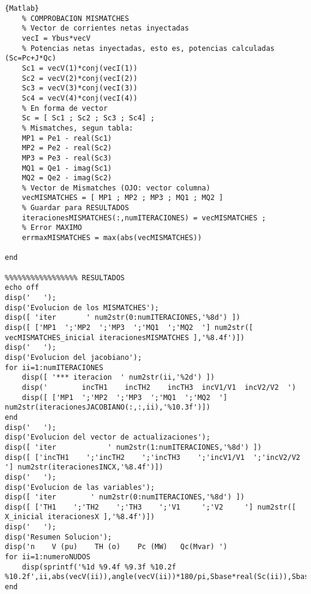 \documentclass[a4paper,10pt,titlepage,oneside]{article}
\begin{document}
{\begin{lstlisting}[frame=lines]{Matlab}
	% COMPROBACION MISMATCHES
	% Vector de corrientes netas inyectadas
	vecI = Ybus*vecV
	% Potencias netas inyectadas, esto es, potencias calculadas (Sc=Pc+J*Qc)
	Sc1 = vecV(1)*conj(vecI(1))
	Sc2 = vecV(2)*conj(vecI(2))
	Sc3 = vecV(3)*conj(vecI(3))
    Sc4 = vecV(4)*conj(vecI(4))
	% En forma de vector
	Sc = [ Sc1 ; Sc2 ; Sc3 ; Sc4] ;
	% Mismatches, segun tabla:
    MP1 = Pe1 - real(Sc1)
	MP2 = Pe2 - real(Sc2)
	MP3 = Pe3 - real(Sc3)
	MQ1 = Qe1 - imag(Sc1)
    MQ2 = Qe2 - imag(Sc2)
	% Vector de Mismatches (OJO: vector columna)
	vecMISMATCHES = [ MP1 ; MP2 ; MP3 ; MQ1 ; MQ2 ]
	% Guardar para RESULTADOS
	iteracionesMISMATCHES(:,numITERACIONES) = vecMISMATCHES ;
	% Error MAXIMO
	errmaxMISMATCHES = max(abs(vecMISMATCHES)) 

end

%%%%%%%%%%%%%%%%% RESULTADOS
echo off
disp('   ');
disp('Evolucion de los MISMATCHES');
disp([ 'iter       ' num2str(0:numITERACIONES,'%8d') ])
disp([ ['MP1  ';'MP2  ';'MP3  ';'MQ1  ';'MQ2  '] num2str([ vecMISMATCHES_inicial iteracionesMISMATCHES ],'%8.4f')])
disp('   ');
disp('Evolucion del jacobiano');
for ii=1:numITERACIONES
	disp([ '*** iteracion  ' num2str(ii,'%2d') ])
	disp('        incTH1    incTH2    incTH3  incV1/V1  incV2/V2  ')
	disp([ ['MP1  ';'MP2  ';'MP3  ';'MQ1  ';'MQ2  '] num2str(iteracionesJACOBIANO(:,:,ii),'%10.3f')])
end
disp('   ');
disp('Evolucion del vector de actualizaciones');
disp([ 'iter            ' num2str(1:numITERACIONES,'%8d') ])
disp([ ['incTH1    ';'incTH2    ';'incTH3    ';'incV1/V1  ';'incV2/V2  '] num2str(iteracionesINCX,'%8.4f')])
disp('   ');
disp('Evolucion de las variables');
disp([ 'iter        ' num2str(0:numITERACIONES,'%8d') ])
disp([ ['TH1    ';'TH2    ';'TH3    ';'V1     ';'V2     '] num2str([ X_inicial iteracionesX ],'%8.4f')])
disp('   ');
disp('Resumen Solucion');
disp('n    V (pu)    TH (o)    Pc (MW)   Qc(Mvar) ')
for ii=1:numeroNUDOS
	disp(sprintf('%1d %9.4f %9.3f %10.2f %10.2f',ii,abs(vecV(ii)),angle(vecV(ii))*180/pi,Sbase*real(Sc(ii)),Sbase*imag(Sc(ii))))
end
\end{lstlisting}
}
\end{document}
